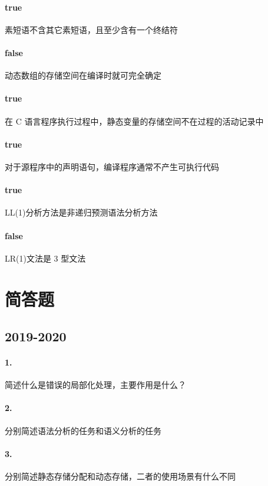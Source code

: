 \documentclass[UTF8]{ctexart} %
\begin{document}
\paragraph{true} 素短语不含其它素短语，且至少含有一个终结符

\paragraph{false} 动态数组的存储空间在编译时就可完全确定

\paragraph{true} 在 C 语言程序执行过程中，静态变量的存储空间不在过程的活动记录中

\paragraph{true} 对于源程序中的声明语句，编译程序通常不产生可执行代码

\paragraph{true} LL(1)分析方法是非递归预测语法分析方法

\paragraph{false} LR(1)文法是 3 型文法

\section{简答题}

\subsection{2019-2020}

\paragraph{1.} 简述什么是错误的局部化处理，主要作用是什么？

\paragraph{2.} 分别简述语法分析的任务和语义分析的任务

\paragraph{3.} 分别简述静态存储分配和动态存储，二者的使用场景有什么不同
\end{document}
